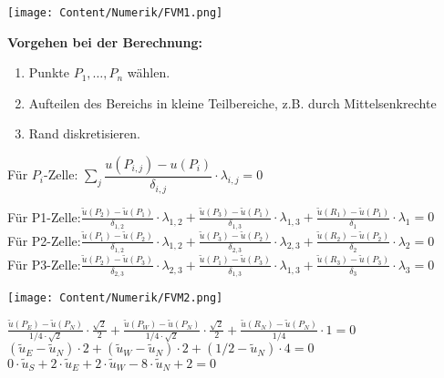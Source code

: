 \begin{minipage}{6cm}
  \texttt{[image: Content/Numerik/FVM1.png]}
\end{minipage}
\hfill
\begin{minipage}{12cm}
  \textbf{Vorgehen bei der Berechnung:}\\
  \begin{enumerate}
    \item Punkte $P_1,\ldots,P_n$ wählen.
    \item Aufteilen des Bereichs in kleine Teilbereiche, z.B. durch Mittelsenkrechte
    \item Rand diskretisieren.\\
  \end{enumerate}

  Für $P_i$-Zelle: $\sum\limits_{j} \dfrac{u(P_{i,j}) - u(P_i)}{\delta_{i,j}} \cdot \lambda_{i,j} = 0$

  Für P1-Zelle:\quad $\frac{\tilde{u}(P_2)-\tilde{u}(P_1)}{\delta_{1,2}}\cdot\lambda_{1,2}+\frac{\tilde{u}(P_3)-\tilde{u}(P_1)}{\delta_{1,3}}\cdot\lambda_{1,3}+\frac{\tilde{u}(R_1)-\tilde{u}(P_1)}{\delta_1}\cdot\lambda_1=0$\\

  Für P2-Zelle:\quad $\frac{\tilde{u}(P_1)-\tilde{u}(P_2)}{\delta_{1,2}}\cdot\lambda_{1,2}+\frac{\tilde{u}(P_3)-\tilde{u}(P_2)}{\delta_{2,3}}\cdot\lambda_{2,3}+\frac{\tilde{u}(R_2)-\tilde{u}(P_2)}{\delta_2}\cdot\lambda_2=0$\\

  Für P3-Zelle:\quad $\frac{\tilde{u}(P_2)-\tilde{u}(P_3)}{\delta_{2,3}}\cdot\lambda_{2,3}+\frac{\tilde{u}(P_1)-\tilde{u}(P_3)}{\delta_{1,3}}\cdot\lambda_{1,3}+\frac{\tilde{u}(R_3)-\tilde{u}(P_3)}{\delta_3}\cdot\lambda_3=0$\\
\end{minipage}

\begin{minipage}{6cm}
  \texttt{[image: Content/Numerik/FVM2.png]}
\end{minipage}
\hfill
\begin{minipage}{12cm}

  $\frac{\tilde{u}(P_E)-\tilde{u}(P_N)}{1/4\cdot\sqrt{2}}\cdot\frac{\sqrt{2}}{2}+\frac{\tilde{u}(P_W)-\tilde{u}(P_N)}{1/4\cdot\sqrt{2}}\cdot\frac{\sqrt{2}}{2}+\frac{\tilde{u}(R_N)-\tilde{u}(P_N)}{1/4}\cdot 1=0$\\

  $(\tilde{u}_E-\tilde{u}_N)\cdot 2 + (\tilde{u}_W-\tilde{u}_N)\cdot 2 + (1/2-\tilde{u}_N)\cdot 4=0$\\

  $0\cdot\tilde{u}_S+2\cdot\tilde{u}_E+2\cdot\tilde{u}_W-8\cdot\tilde{u}_N+2=0$


\end{minipage}

